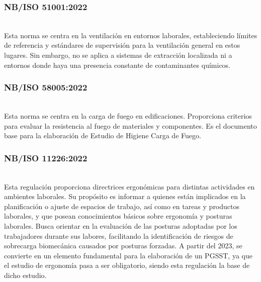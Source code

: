 \subsubsection{NB/ISO 51001:2022}\hfill\\ %
\indent
Esta norma se centra en la ventilación en entornos laborales, estableciendo límites de referencia y estándares de supervisión para la ventilación general en estos lugares. Sin embargo, no se aplica a sistemas de extracción localizada ni a entornos donde haya una presencia constante de contaminantes químicos.

\subsubsection{NB/ISO 58005:2022}\hfill\\ %
\indent
Esta norma se centra en la carga de fuego en edificaciones. Proporciona criterios para evaluar la resistencia al fuego de materiales y componentes. Es el documento base para la elaboración
de Estudio de Higiene Carga de Fuego.

\subsubsection{NB/ISO 11226:2022}\hfill\\ %
\indent
Esta regulación proporciona directrices ergonómicas para distintas actividades en ambientes laborales. Su propósito es informar a quienes están implicados en la planificación o ajuste de espacios de trabajo, así como en tareas y productos laborales, y que posean conocimientos básicos sobre ergonomía y posturas laborales. Busca orientar en la evaluación de las posturas adoptadas por los trabajadores durante sus labores, facilitando la identificación de riesgos de sobrecarga biomecánica causados por posturas forzadas. A partir del 2023, se convierte en un elemento fundamental para la elaboración de un PGSST, ya que el estudio de ergonomía pasa a ser obligatorio, siendo esta regulación la base de dicho estudio.

